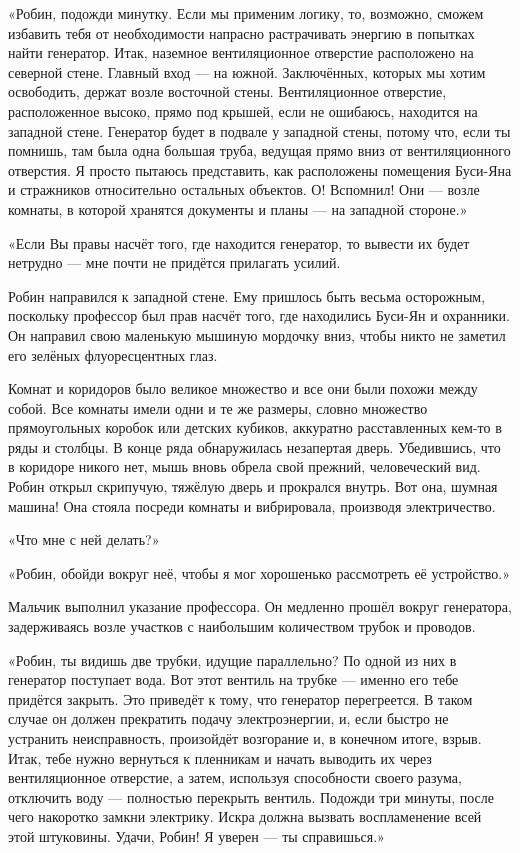 \documentclass[a5paper, 9pt,
final, openany, twoside=true]{memoir}
\begin{document}
«Робин, подожди минутку. Если мы применим логику, то, возможно, сможем избавить тебя от необходимости напрасно растрачивать энергию в попытках найти генератор. Итак, наземное вентиляционное отверстие расположено на северной стене. Главный вход — на южной. Заключённых, которых мы хотим освободить, держат возле восточной стены. Вентиляционное отверстие, расположенное высоко, прямо под крышей, если не ошибаюсь, находится на западной стене. Генератор будет в подвале у западной стены, потому что, если ты помнишь, там была одна большая труба, ведущая прямо вниз от вентиляционного отверстия. Я просто пытаюсь представить, как расположены помещения Буси-Яна и стражников относительно остальных объектов. О! Вспомнил! Они — возле комнаты, в которой хранятся документы и планы — на западной стороне.»

«Если Вы правы насчёт того, где находится генератор, то вывести их будет нетрудно — мне почти не придётся прилагать усилий.\bigskip

Робин направился к западной стене. Ему пришлось быть весьма осторожным, поскольку профессор был прав насчёт того, где находились Буси-Ян и охранники. Он направил свою маленькую мышиную мордочку вниз, чтобы никто не заметил его зелёных флуоресцентных глаз.

Комнат и коридоров было великое множество и все они были похожи между собой. Все комнаты имели одни и те же размеры, словно множество прямоугольных коробок или детских кубиков, аккуратно расставленных кем-то в ряды и столбцы. В конце ряда обнаружилась незапертая дверь. Убедившись, что в коридоре никого нет, мышь вновь обрела свой прежний, человеческий вид. Робин открыл скрипучую, тяжёлую дверь и прокрался внутрь. Вот она, шумная машина! Она стояла посреди комнаты и вибрировала, производя электричество.

«Что мне с ней делать?»

«Робин, обойди вокруг неё, чтобы я мог хорошенько рассмотреть её устройство.»

Мальчик выполнил указание профессора. Он медленно прошёл вокруг генератора, задерживаясь возле участков с наибольшим количеством трубок и проводов.

«Робин, ты видишь две трубки, идущие параллельно? По одной из них в генератор поступает вода. Вот этот вентиль на трубке — именно его тебе придётся закрыть. Это приведёт к тому, что генератор перегреется. В таком случае он должен прекратить подачу электроэнергии, и, если быстро не устранить неисправность, произойдёт возгорание и, в конечном итоге, взрыв. Итак, тебе нужно вернуться к пленникам и начать выводить их через вентиляционное отверстие, а затем, используя способности своего разума, отключить воду — полностью перекрыть вентиль. Подожди три минуты, после чего накоротко замкни электрику. Искра должна вызвать воспламенение всей этой штуковины. Удачи, Робин! Я уверен — ты справишься.»\bigskip
\end{document}
